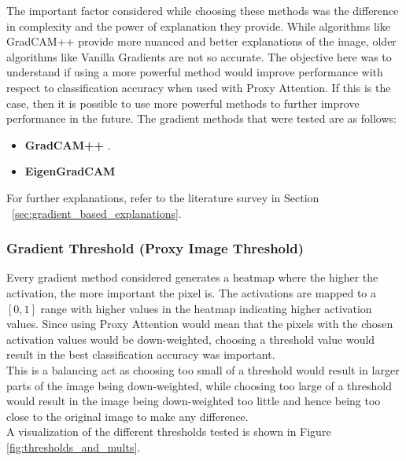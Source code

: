 The important factor considered while choosing these methods was the difference in complexity and the power of explanation they provide. While algorithms like GradCAM++ \cite{chattopadhayGradCAMGeneralizedGradientBased2018} provide more nuanced and better explanations of the image, older algorithms like Vanilla Gradients \cite{zeilerVisualizingUnderstandingConvolutional2013} are not so accurate. The objective here was to understand if using a more powerful method would improve performance with respect to classification accuracy when used with Proxy Attention. If this is the case, then it is possible to use more powerful methods to further improve performance in the future.
The gradient methods that were tested are as follows:
\begin{itemize}
    \item \textbf{GradCAM++} \cite{chattopadhayGradCAMGeneralizedGradientBased2018}.
    \item \textbf{EigenGradCAM} \cite{banymuhammadEigenCAMVisualExplanations2021}
\end{itemize}
For further explanations, refer to the literature survey in Section ~\ref{sec:gradient_based_explanations}.

\subsubsection{Gradient Threshold (Proxy Image Threshold)}
Every gradient method considered generates a heatmap where the higher the activation, the more important the pixel is. The activations are mapped to a $[0,1]$ range with higher values in the heatmap indicating higher activation values. Since using Proxy Attention would mean that the pixels with the chosen activation values would be down-weighted, choosing a threshold value would result in the best classification accuracy was important.\\
This is a balancing act as choosing too small of a threshold would result in larger parts of the image being down-weighted, while choosing too large of a threshold would result in the image being down-weighted too little and hence being too close to the original image to make any difference.\\
A visualization of the different thresholds tested is shown in Figure \ref{fig:thresholds_and_mults}.


